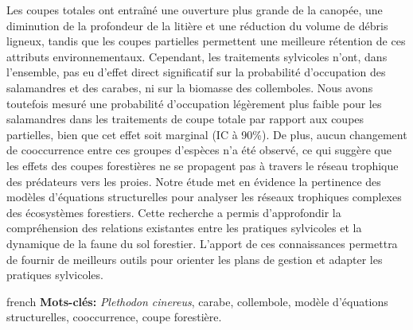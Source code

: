 Les coupes totales ont entraîné une ouverture plus grande de la canopée, une diminution de la profondeur de la litière et une réduction du volume de débris ligneux, 
tandis que les coupes partielles permettent une meilleure rétention de ces attributs environnementaux. 
Cependant, les traitements sylvicoles n’ont, dans l’ensemble, pas eu d’effet direct significatif sur la probabilité d’occupation des salamandres et des carabes, ni sur la biomasse des collemboles. 
Nous avons toutefois mesuré une probabilité d’occupation légèrement plus faible pour les salamandres dans les traitements de coupe totale par rapport aux coupes partielles, bien que cet effet soit marginal (IC à 90\%). 
De plus, aucun changement de cooccurrence entre ces groupes d’espèces n’a été observé, ce qui suggère que les effets des coupes forestières ne se propagent pas à travers le réseau trophique des prédateurs vers les proies. 
Notre étude met en évidence la pertinence des modèles d’équations structurelles pour analyser les réseaux trophiques complexes des écosystèmes forestiers. 
Cette recherche a permis d'approfondir la compréhension des relations existantes entre les pratiques sylvicoles et la dynamique de la faune du sol forestier. 
L'apport de ces connaissances permettra de fournir de meilleurs outils pour orienter les plans de gestion et adapter les pratiques sylvicoles. 


\begin{otherlanguage*}{french}
\textbf{Mots-clés:} \textit{Plethodon cinereus}, carabe, collembole, modèle d'équations structurelles, cooccurrence, coupe forestière.
\end{otherlanguage*}

